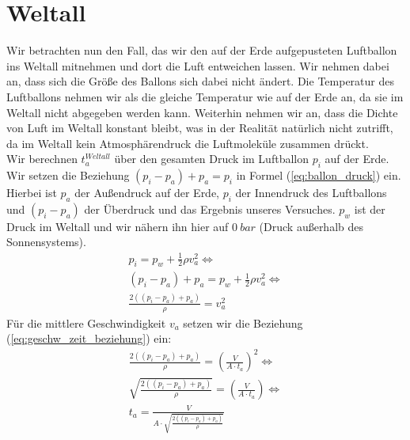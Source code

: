 \documentclass{article}
\begin{document}
    \section{Weltall}
        Wir betrachten nun den Fall, das wir den auf der Erde aufgepusteten Luftballon ins Weltall mitnehmen und dort die Luft entweichen lassen.
        Wir nehmen dabei an, dass sich die Größe des Ballons sich dabei nicht ändert.
        Die Temperatur des Luftballons nehmen wir als die gleiche Temperatur wie auf der Erde an, da sie im Weltall nicht abgegeben werden kann.
        Weiterhin nehmen wir an, dass die Dichte von Luft im Weltall konstant bleibt, was in der Realität natürlich nicht zutrifft, da im Weltall kein Atmosphärendruck die Luftmoleküle zusammen drückt. \\
        Wir berechnen \(t_a^{Weltall}\) über den gesamten Druck im Luftballon \( p_i \) auf der Erde.
        Wir setzen die Beziehung \((p_i - p_a) + p_a = p_i \) in Formel (\ref{eq:ballon_druck}) ein.
        Hierbei ist \(p_a\) der Außendruck auf der Erde, \(p_i\) der Innendruck des Luftballons und \((p_i - p_a)\) der Überdruck und das Ergebnis unseres Versuches.
        \(p_w\) ist der Druck im Weltall und wir nähern ihn hier auf \(\SI{0}{bar}\) (Druck außerhalb des Sonnensystems).
        \begin{equation}
            \begin{gathered}
                p_i = p_w + \frac{1}{2} \rho v_a^2 \Leftrightarrow \\
                (p_i - p_a) + p_a = p_w + \frac{1}{2} \rho v_a^2 \Leftrightarrow \\
                \frac{2((p_i - p_a) + p_a)}{ \rho } = v_a^2
            \end{gathered}
        \end{equation}
        Für die mittlere Geschwindigkeit \(v_a\) setzen wir die Beziehung (\ref{eq:geschw_zeit_beziehung}) ein:
        \begin{equation}
            \begin{gathered}
                \frac{ 2((p_i - p_a) + p_a)}{ \rho } = { \left( \frac{V}{A \cdot t_a} \right) }^2 \Leftrightarrow \\
                \sqrt{ \frac{ 2((p_i - p_a) + p_a)}{ \rho } } = \left( \frac{V}{A \cdot t_a} \right) \Leftrightarrow \\
                t_a = \frac{V}{ A \cdot \sqrt{ \frac{ 2((p_i - p_a) + p_a)}{ \rho }} }
            \end{gathered}
        \end{equation}
\end{document}
